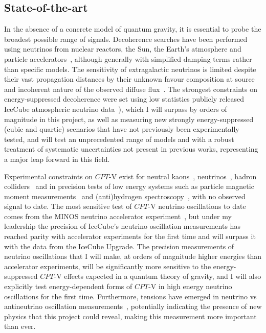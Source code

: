 \documentclass[a4paper,11pt]{article}
\begin{document}
\subsection{State-of-the-art}

In the absence of a concrete model of quantum gravity, it is essential to probe the broadest possible range of signals. Decoherence searches have been performed using neutrinos from nuclear reactors, the Sun, the Earth's atmosphere and particle accelerators~\cite{PhysRevLett.85.1166, Abbasi:2009nfa, PhysRevD.89.053002, Bakhti:2015dca, Coelho:2017zes, PhysRevD.95.113005, Coloma:2018idr, de_Holanda_2020}, although generally with simplified damping terms rather than specific models. The sensitivity of extragalactic neutrinos is limited despite their vast propagation distances by their unknown favour composition at source and incoherent nature of the observed diffuse flux~\cite{PhysRevD.102.115003}. The strongest constraints on energy-suppressed decoherence were set using low statistics publicly released IceCube atmospheric neutrino data~\cite{Coloma:2018idr}), which I will surpass by orders of magnitude in this project, as well as measuring new strongly energy-suppressed (cubic and quartic) scenarios that have not previously been experimentally tested, and will test an unprecedented range of models and with a robust treatment of systematic uncertainties not present in previous works, representing a major leap forward in this field.

Experimental constraints on $CPT$-V exist for neutral kaons~\cite{Ellis:1999xh, Ambrosino:2006ek, Abouzaid:2010ny, Babusci:2013gda, Schubert:2014ska}, neutrinos~\cite{Adamson:2013whj, Ohlsson:2014cha}, hadron colliders~\cite{Aad:2013eva, vanTilburg:2016awx} and in precision tests of low energy systems such as particle magnetic moment measurements~\cite{Bluhm:1997ci, Bennett:2007aa} and (anti)hydrogen spectroscopy~\cite{Kostelecky:2015nma}, with no observed signal to date. The most sensitive test of $CPT$-V neutrino oscillations to date comes from the MINOS neutrino accelerator experiment~\cite{Adamson:2013whj}, but under my leadership the precision of IceCube's neutrino oscillation measurements has reached parity with accelerator experiments for the first time and will surpass it with the data from the IceCube Upgrade. The precision measurements of neutrino oscillations that I will make, at orders of magnitude higher energies than accelerator experiments, will be significantly more sensitive to the energy-suppressed $CPT$-V effects expected in a quantum theory of gravity, and I will also explicitly test energy-dependent forms of $CPT$-V in high energy neutrino oscillations for the first time. Furthermore, tensions have emerged in neutrino vs antineutrino oscillation measurements~\cite{Abe:2019vii,NOvA_CP_result}, potentially indicating the presence of new physics that this project could reveal, making this measurement more important than ever. \\
\end{document}
